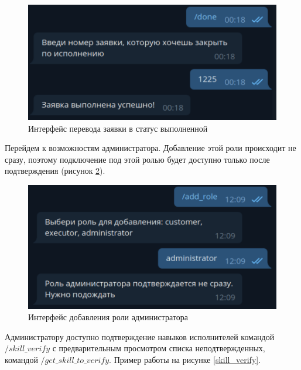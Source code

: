 \begin{figure}[H]
	\begin{center}
		\includegraphics[page=1,scale=0.5]{assets/done.pdf}
	\end{center}
	\caption{Интерфейс перевода заявки в статус выполненной}
	\label{done}
\end{figure}

Перейдем к возможностям администратора. Добавление этой роли происходит не сразу, поэтому подключение под этой ролью будет доступно только после подтверждения (рисунок \ref{add_adm}).

\begin{figure}[H]
	\begin{center}
		\includegraphics[page=1,scale=0.5]{assets/add_adm.pdf}
	\end{center}
	\caption{Интерфейс добавления роли администратора}
	\label{add_adm}
\end{figure}

Администратору доступно подтверждение навыков исполнителей командой $/skill\_verify$ с предварительным просмотром списка неподтвержденных, командой $/get\_skill\_to\_verify$. Пример работы на рисунке \ref{skill_verify}.

